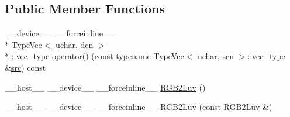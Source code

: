 \subsection*{Public Member Functions}
\begin{DoxyCompactItemize}
\item 
\-\_\-\-\_\-device\-\_\-\-\_\- \-\_\-\-\_\-forceinline\-\_\-\-\_\- \\*
\hyperlink{structcv_1_1gpu_1_1device_1_1TypeVec}{Type\-Vec}$<$ \hyperlink{core_2types__c_8h_a65f85814a8290f9797005d3b28e7e5fc}{uchar}, dcn $>$\\*
\-::vec\-\_\-type \hyperlink{structcv_1_1gpu_1_1device_1_1color__detail_1_1RGB2Luv_3_01uchar_00_01scn_00_01dcn_00_01srgb_00_01blueIdx_01_4_a022ad8e8ac1eaede1c219834b8897133}{operator()} (const typename \hyperlink{structcv_1_1gpu_1_1device_1_1TypeVec}{Type\-Vec}$<$ \hyperlink{core_2types__c_8h_a65f85814a8290f9797005d3b28e7e5fc}{uchar}, scn $>$\-::vec\-\_\-type \&\hyperlink{legacy_8hpp_a371cd109b74033bc4366f584edd3dacc}{src}) const 
\item 
\-\_\-\-\_\-host\-\_\-\-\_\- \-\_\-\-\_\-device\-\_\-\-\_\- \-\_\-\-\_\-forceinline\-\_\-\-\_\- \hyperlink{structcv_1_1gpu_1_1device_1_1color__detail_1_1RGB2Luv_3_01uchar_00_01scn_00_01dcn_00_01srgb_00_01blueIdx_01_4_a2a9ae2b2a197fe734e9afb362f25e3e0}{R\-G\-B2\-Luv} ()
\item 
\-\_\-\-\_\-host\-\_\-\-\_\- \-\_\-\-\_\-device\-\_\-\-\_\- \-\_\-\-\_\-forceinline\-\_\-\-\_\- \hyperlink{structcv_1_1gpu_1_1device_1_1color__detail_1_1RGB2Luv_3_01uchar_00_01scn_00_01dcn_00_01srgb_00_01blueIdx_01_4_a50938ca9d530c0323386046a73b8f949}{R\-G\-B2\-Luv} (const \hyperlink{structcv_1_1gpu_1_1device_1_1color__detail_1_1RGB2Luv}{R\-G\-B2\-Luv} \&)
\end{DoxyCompactItemize}



